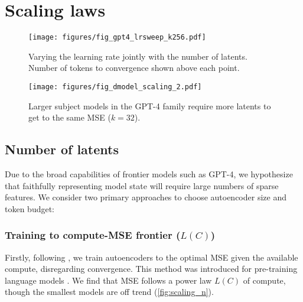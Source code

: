 \section{Scaling laws}
\label{sec:scaling}













\begin{figure}
\centering
\begin{minipage}{.48\textwidth}
    \centering
    \texttt{[image: figures/fig\_gpt4\_lrsweep\_k256.pdf]}
    \caption{Varying the learning rate jointly with the number of latents. Number of tokens to convergence shown above each point.}
    \label{fig:lrsweepgpt4}
\end{minipage}%
\hspace{10pt}
\begin{minipage}{.48\textwidth}
    \centering
    \texttt{[image: figures/fig\_dmodel\_scaling\_2.pdf]}
    \caption{Larger subject models in the GPT-4 family require more latents to get to the same MSE ($k=32$).}
    \label{fig:scaling_s}
\end{minipage}
\end{figure}



\subsection{Number of latents} 


Due to the broad capabilities of frontier models such as GPT-4, we hypothesize that faithfully representing model state will require large numbers of sparse features. We consider two primary approaches to choose autoencoder size and token budget:%

\subsubsection{Training to compute-MSE frontier (\texorpdfstring{$L(C)$}{L(C)})}

Firstly, following \citet{lindsey2024scaling}, we train autoencoders to the optimal MSE given the available compute, disregarding convergence.  This method was introduced for pre-training language models \citep{kaplan2020scaling,hoffmann2022training}.  We find that MSE follows a power law $L(C)$ of compute, though the smallest models are off trend
(\autoref{fig:scaling_n}).

